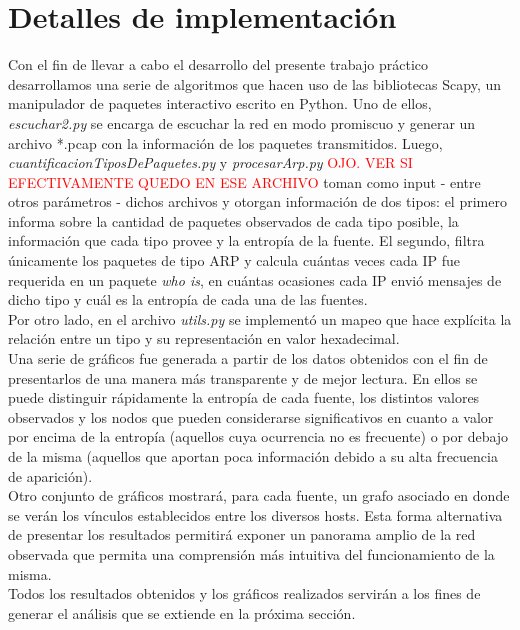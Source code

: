 \section{Detalles de implementación}

Con el fin de llevar a cabo el desarrollo del presente trabajo práctico desarrollamos una serie de algoritmos que hacen uso de las bibliotecas Scapy, un manipulador de paquetes interactivo escrito en Python. Uno de ellos, \textit{escuchar2.py} se encarga de escuchar la red en modo promiscuo y generar un archivo *.pcap con la información de los paquetes transmitidos.  Luego, \textit{cuantificacionTiposDePaquetes.py} y \textit{procesarArp.py} \textcolor{red}{OJO. VER SI EFECTIVAMENTE QUEDO EN ESE ARCHIVO} toman como input - entre otros parámetros - dichos archivos y otorgan información de dos tipos: el primero informa sobre la cantidad de paquetes observados de cada tipo posible, la información que cada tipo provee y la entropía de la fuente. El segundo, filtra únicamente los paquetes de tipo ARP y calcula cuántas veces cada IP fue requerida en un paquete \textit{who is}, en cuántas ocasiones cada IP envió mensajes de dicho tipo y cuál es la entropía de cada una de las fuentes. \\
Por otro lado, en el archivo \textit{utils.py} se implementó un mapeo que hace explícita la relación entre un tipo y su representación en valor hexadecimal. \\

Una serie de gráficos fue generada a partir de los datos obtenidos con el fin de presentarlos de una manera más transparente y de mejor lectura. En ellos se puede distinguir rápidamente la entropía de cada fuente, los distintos valores observados y los nodos que pueden considerarse significativos en cuanto a valor por encima de la entropía (aquellos cuya ocurrencia no es frecuente) o por debajo de la misma (aquellos que aportan poca información debido a su alta frecuencia de aparición).\\
Otro conjunto de gráficos mostrará, para cada fuente, un grafo asociado en donde se verán los vínculos establecidos entre los diversos hosts. Esta forma alternativa de presentar los resultados permitirá exponer un panorama amplio de la red observada que permita una comprensión más intuitiva del funcionamiento de la misma.\\

Todos los resultados obtenidos y los gráficos realizados servirán a los fines de generar el análisis que se extiende en la próxima sección.
